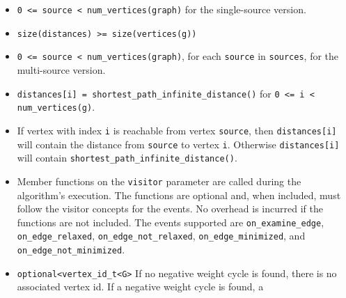 \begin{itemdescr}
      \pnum\hardprecond
            \begin{itemize}
                  \item
                        \lstinline{0 <= source < num_vertices(graph)} for the single-source version. 
                  \item 
                        \lstinline{size(distances) >= size(vertices(g))}
            \end{itemize}
      \pnum\preconditions
            \begin{itemize}
                  \item
                        \lstinline{0 <= source < num_vertices(graph)}, for each \lstinline{source} in \lstinline{sources}, 
                                   for the multi-source version.
                  \item
                        \lstinline{distances[i] = shortest_path_infinite_distance()} for \lstinline{0 <= i < num_vertices(g)}.
            \end{itemize}
      \pnum\effects
            \begin{itemize}
                  \item
                        If vertex with index \lstinline{i} is reachable from vertex \lstinline{source}, then
                        \lstinline{distances[i]} will contain the distance from \lstinline{source} to vertex
                        \lstinline{i}.  Otherwise \lstinline{distances[i]} will contain
                        \lstinline{shortest_path_infinite_distance()}.
                  \item Member functions on the \lstinline{visitor} parameter are called during the algorithm's execution.
                        The functions are optional and, when included, must follow the visitor concepts for the events.
                        No overhead is incurred if the functions are not included.
                        The events supported are \lstinline{on_examine_edge}, \lstinline{on_edge_relaxed}, \lstinline{on_edge_not_relaxed},
                        \lstinline{on_edge_minimized}, and \lstinline{on_edge_not_minimized}.
            \end{itemize}
      \pnum\returns 
            \begin{itemize}
                  \item \lstinline{optional<vertex_id_t<G>} If no negative weight cycle is found, 
                        there is no associated vertex id. If a negative weight cycle is found, a

\end{itemize}
\end{itemdescr}
